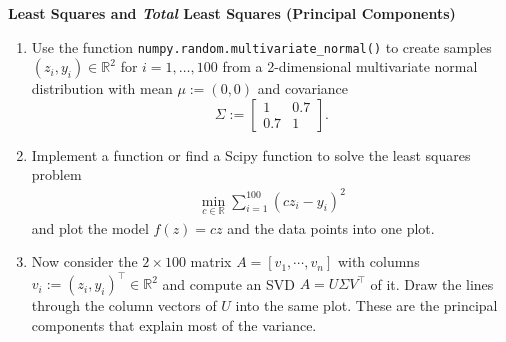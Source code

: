 \textbf{\normalsize Least Squares and \textit{Total} Least Squares (Principal Components)}

\begin{enumerate}
	\item  Use the function \verb|numpy.random.multivariate_normal()| to create samples $(z_i,y_i) \in \mathbb{R}^2$ for $i = 1,\dots, 100$ from a 2-dimensional multivariate normal distribution
	with mean $\mu := (0,0)$ and covariance $$\Sigma := \begin{bmatrix}
	1&0.7\\
	0.7&1
	\end{bmatrix}.$$
	\item Implement a function or find a Scipy function to solve the least squares problem
		\begin{align*}
			\min \limits_{c \in \mathbb{R}} \sum_{i=1}^{100} ( c z_i - y_i )^2
		\end{align*}
		and plot the model $f(z)=cz$ and the data points into one plot.
\item Now consider the $2\times100$ matrix $A = [v_1,\cdots, v_n]$ with columns $v_i := (z_i,y_i)^\top \in \mathbb{R}^2$ and compute an SVD $A=U\Sigma V^\top$ of it. Draw the lines through the column vectors of $U$ into the same plot. These are the principal components that explain most of the variance.~\\

\end{enumerate}

%
